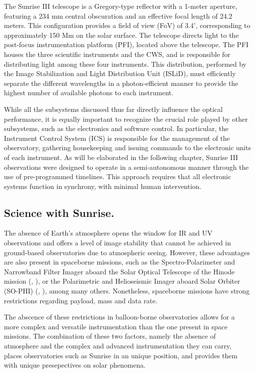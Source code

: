 The Sunrise III telescope is a Gregory-type reflector with a 1-meter aperture, featuring a 234 mm central obscuration and an effective focal length of 24.2 meters. This configuration provides a field of view (FoV) of 3.4', corresponding to approximately 150 Mm on the solar surface. The telescope directs light to the post-focus instrumentation platform (PFI), located above the telescope. The PFI houses the three scientific instruments and the CWS, and is responsible for distributing light among these four instruments. This distribution, performed by the Image Stabilization and Light Distribution Unit (ISLiD), must efficiently separate the different wavelengths in a photon-efficient manner to provide the highest number of available photons to each instrument. 

While all the subsystems discussed thus far directly influence the optical performance, it is equally important to recognize the crucial role played by other subsystems, such as the electronics and software control. In particular, the Instrument Control System (ICS) is responsible for the management of the observatory, gathering housekeeping and issuing commands to the electronic units of each instrument. As will be elaborated in the following chapter, Sunrise III observations were designed to operate in a semi-autonomous manner through the use of pre-programmed timelines. This approach requires that all electronic systems function in synchrony, with minimal human intervention. 

\subsection{Science with Sunrise.}

The absence of Earth's atmosphere opens the window for IR and UV observations and offers a level of image stability that cannot be achieved in ground-based observatories due to atmospheric seeing. However, these advantages are also present in spaceborne missions, such as the Spectro-Polarimeter and Narrowband Filter Imager aboard the Solar Optical Telescope of the Hinode mission (\citealt{Hinode}, \citealt{sot}), or the Polarimetric and Helioseismic Imager aboard Solar Orbiter (SO-PHI) (\citealt{PHI}, \citealt{SO}), among many others. Nonetheless, spaceborne missions have strong restrictions regarding payload, mass and data rate. 

The abscence of these restrictions in balloon-borne observatories allows for a more complex and versatile instrumentation than the one present in space missions. The combination of these two factors, namely the absence of atmosphere and the complex and advanced instrumentation they can carry, places observatories such as Sunrise in an unique position, and provides them with unique presepectives on solar phenomena.

